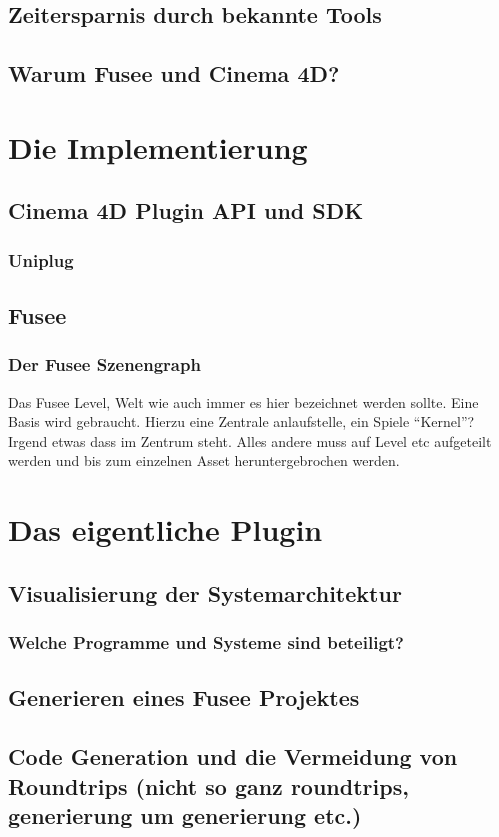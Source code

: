 \documentclass[pagesize, paper=a4, fontsize=12pt,titlepage=true, headings=small, headnosepline, abstractoff, liststotoc, nochapterprefix, plainheadsepline, twoside]{scrreprt}
\begin{document}
\subsection{Zeitersparnis durch bekannte Tools}
\subsection{Warum Fusee und Cinema 4D?}

\section{Die Implementierung}
\subsection{Cinema 4D Plugin API und SDK}
\subsubsection{Uniplug}
\subsection{Fusee}
\subsubsection{Der Fusee Szenengraph}
Das Fusee Level, Welt wie auch immer es hier bezeichnet werden sollte. Eine Basis wird gebraucht. Hierzu eine Zentrale anlaufstelle, ein Spiele “Kernel”? Irgend etwas dass im Zentrum steht.
Alles andere muss auf Level etc aufgeteilt werden und bis zum einzelnen Asset heruntergebrochen werden.

\section{Das eigentliche Plugin}
\subsection{Visualisierung der Systemarchitektur}
\subsubsection{Welche Programme und Systeme sind beteiligt?}
\subsection{Generieren eines Fusee Projektes}
\subsection{Code Generation und die Vermeidung von Roundtrips (nicht so ganz roundtrips, generierung um generierung etc.)}
\end{document}
